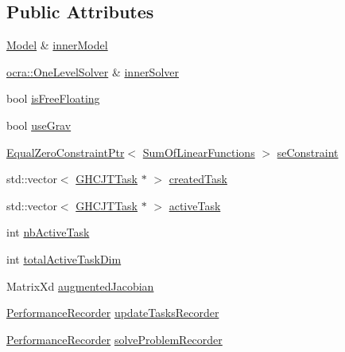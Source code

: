 \subsection*{Public Attributes}
\begin{DoxyCompactItemize}
\item 
\hyperlink{classocra_1_1Model}{Model} \& \hyperlink{structgocra_1_1GHCJTController_1_1Pimpl_a43eb79ddf7ef332d76d850711fc57e8e}{inner\+Model}
\item 
\hyperlink{classocra_1_1OneLevelSolver}{ocra\+::\+One\+Level\+Solver} \& \hyperlink{structgocra_1_1GHCJTController_1_1Pimpl_af06224d9d2a704cb042b5b01d3bf18ab}{inner\+Solver}
\item 
bool \hyperlink{structgocra_1_1GHCJTController_1_1Pimpl_a04bbff0e011a7c0b2bff47c08ed32993}{is\+Free\+Floating}
\item 
bool \hyperlink{structgocra_1_1GHCJTController_1_1Pimpl_a0a9b1d16fc029929004e00dbf358063a}{use\+Grav}
\item 
\hyperlink{classocra_1_1EqualZeroConstraintPtr}{Equal\+Zero\+Constraint\+Ptr}$<$ \hyperlink{classocra_1_1SumOfLinearFunctions}{Sum\+Of\+Linear\+Functions} $>$ \hyperlink{structgocra_1_1GHCJTController_1_1Pimpl_abbc7f37d47e968b025652ade01739ab8}{se\+Constraint}
\item 
std\+::vector$<$ \hyperlink{classgocra_1_1GHCJTTask}{G\+H\+C\+J\+T\+Task} $\ast$ $>$ \hyperlink{structgocra_1_1GHCJTController_1_1Pimpl_ae336064c9007227c37ec24f455b4cc39}{created\+Task}
\item 
std\+::vector$<$ \hyperlink{classgocra_1_1GHCJTTask}{G\+H\+C\+J\+T\+Task} $\ast$ $>$ \hyperlink{structgocra_1_1GHCJTController_1_1Pimpl_a2322f7612c4ee994869b897d6546da97}{active\+Task}
\item 
int \hyperlink{structgocra_1_1GHCJTController_1_1Pimpl_acc8e0872a4a56af752e5556f8b5c83d5}{nb\+Active\+Task}
\item 
int \hyperlink{structgocra_1_1GHCJTController_1_1Pimpl_a9814826f2b30accde751b9f343b3590b}{total\+Active\+Task\+Dim}
\item 
Matrix\+Xd \hyperlink{structgocra_1_1GHCJTController_1_1Pimpl_a9ebc2b951dfa979568dfe12a36124424}{augmented\+Jacobian}
\item 
\hyperlink{classgocra_1_1PerformanceRecorder}{Performance\+Recorder} \hyperlink{structgocra_1_1GHCJTController_1_1Pimpl_a7305b9fe096cfd38ba50af0797484a6a}{update\+Tasks\+Recorder}
\item 
\hyperlink{classgocra_1_1PerformanceRecorder}{Performance\+Recorder} \hyperlink{structgocra_1_1GHCJTController_1_1Pimpl_a949ca96a7b5a333e0594c6e6eda106a1}{solve\+Problem\+Recorder}
\end{DoxyCompactItemize}


